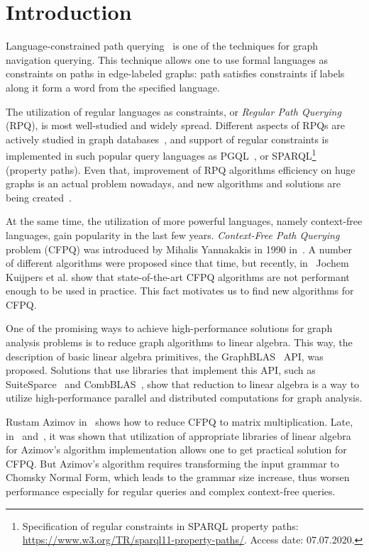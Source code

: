 \section{Introduction}


Language-constrained path querying~\cite{barrett2000formal} is one of the techniques for graph navigation querying.
This technique allows one to use formal languages as constraints on paths in edge-labeled graphs: path satisfies constraints if labels along it form a word from the specified language.

The utilization of regular languages as constraints, or \textit{Regular Path Querying} (RPQ), is most well-studied and widely spread.
Different aspects of RPQs are actively studied in graph databases~\cite{10.1145/2463664.2465216, 10.1145/3104031,10.1145/2850413}, and support of regular constraints is implemented in such popular query languages as PGQL~\cite{10.1145/2960414.2960421}, or SPARQL\footnote{Specification of regular constraints in SPARQL property paths: \url{https://www.w3.org/TR/sparql11-property-paths/}. Access date: 07.07.2020.}~\cite{10.1007/978-3-319-25007-6_1} (property paths).
Even that, improvement of RPQ algorithms efficiency on huge graphs is an actual problem nowadays, and new algorithms and solutions are being created~\cite{Wang2019,10.1145/2949689.2949711}.

At the same time, the utilization of more powerful languages, namely context-free languages, gain popularity in the last few years. 
\textit{Context-Free Path Querying} problem (CFPQ) was introduced by Mihalis Yannakakis in 1990 in~\cite{Yannakakis}.
A number of different algorithms were proposed since that time, but recently, in~\cite{Kuijpers:2019:ESC:3335783.3335791} Jochem Kuijpers et al. show that state-of-the-art CFPQ algorithms are not performant enough to be used in practice.
This fact motivates us to find new algorithms for CFPQ.

One of the promising ways to achieve high-performance solutions for graph analysis problems is to reduce graph algorithms to linear algebra.
This way, the description of basic linear algebra primitives, the GraphBLAS~\cite{7761646} API, was proposed.
Solutions that use libraries that implement this API, such as SuiteSparce~\cite{10.1145/3322125} and CombBLAS~\cite{10.1177/1094342011403516}, show that reduction to linear algebra is a way to utilize high-performance parallel and distributed computations for graph analysis.

Rustam Azimov in~\cite{Azimov:2018:CPQ:3210259.3210264} shows how to reduce CFPQ to matrix multiplication.
Late, in~\cite{Mishin:2019:ECP:3327964.3328503} and~\cite{10.1145/3398682.3399163}, it was shown that utilization of appropriate libraries of linear algebra for Azimov's algorithm implementation allows one to get practical solution for CFPQ.
But Azimov's algorithm requires transforming the input grammar to Chomsky Normal Form, which leads to the grammar size increase, thus worsen performance especially for regular queries and complex context-free queries.

